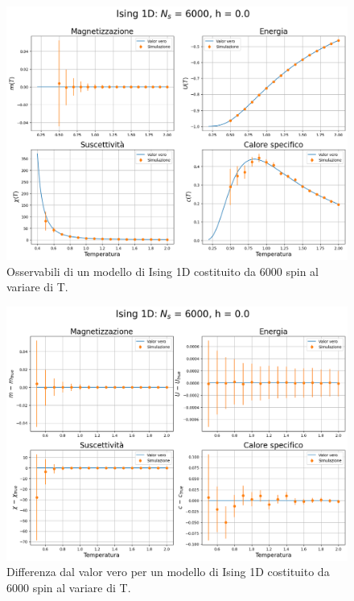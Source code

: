 \vspace*{\fill}

\newpage

\vspace*{\fill}

\begin{figure}[htbp]
    \centering
    \includegraphics[page=1, width=\textwidth]{Immagini/simIsing1D/obs/obs_6000_0.0.png}
    \caption{Osservabili di un modello di Ising 1D costituito da 6000 spin al variare di T.}
\end{figure}

\vspace*{\fill}

\newpage

\vspace*{\fill}

\begin{figure}[htbp]
    \centering
    \includegraphics[page=1, width=\textwidth]{Immagini/simIsing1D/obs/obs_6000_0.0_diff.png}
    \caption{Differenza dal valor vero per un modello di Ising 1D costituito da 6000 spin al variare di T.}
\end{figure}

